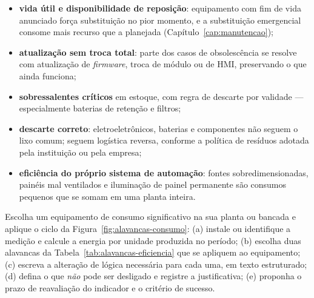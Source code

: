 \begin{itemize}
  \item \textbf{vida útil e disponibilidade de reposição}: equipamento com fim de vida anunciado
        força substituição no pior momento, e a substituição emergencial consome mais recurso que a
        planejada (Capítulo~\ref{cap:manutencao});
  \item \textbf{atualização sem troca total}: parte dos casos de obsolescência se resolve com
        atualização de \emph{firmware}, troca de módulo ou de HMI, preservando o que ainda funciona;
  \item \textbf{sobressalentes críticos} em estoque, com regra de descarte por validade ---
        especialmente baterias de retenção e filtros;
  \item \textbf{descarte correto}: eletroeletrônicos, baterias e componentes não seguem o lixo comum;
        seguem logística reversa, conforme a política de resíduos adotada pela instituição ou pela
        empresa;
  \item \textbf{eficiência do próprio sistema de automação}: fontes sobredimensionadas, painéis mal
        ventilados e iluminação de painel permanente são consumos pequenos que se somam em uma planta
        inteira.
\end{itemize}

\begin{pratica}
Escolha um equipamento de consumo significativo na sua planta ou bancada e aplique o ciclo da
Figura~\ref{fig:alavancas-consumo}:
(a) instale ou identifique a medição e calcule a energia por unidade produzida no período;
(b) escolha duas alavancas da Tabela~\ref{tab:alavancas-eficiencia} que se apliquem ao equipamento;
(c) escreva a alteração de lógica necessária para cada uma, em texto estruturado;
(d) defina o que \emph{não} pode ser desligado e registre a justificativa;
(e) proponha o prazo de reavaliação do indicador e o critério de sucesso.
\end{pratica}

